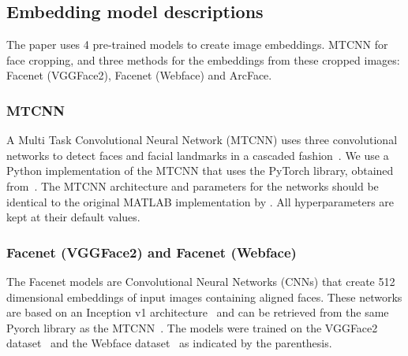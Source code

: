 \subsection{Embedding model descriptions}

The paper uses 4 pre-trained models to create image embeddings.
MTCNN for face cropping, and three methods for the embeddings from these cropped images: Facenet (VGGFace2), Facenet (Webface) and ArcFace.

\subsubsection{MTCNN}
A Multi Task Convolutional Neural Network (MTCNN) uses three convolutional networks to detect faces and facial landmarks in a cascaded fashion~\cite{zhang2016jointmtcnn}.
We use a Python implementation of the MTCNN that uses the PyTorch library, obtained from~\cite{facenetpytorch}.
The MTCNN architecture and parameters for the networks should be identical to the original MATLAB implementation by \citeauthor{zhang2016jointmtcnn}.
All hyperparameters are kept at their default values.

\subsubsection{Facenet (VGGFace2) and Facenet (Webface)}
The Facenet models are Convolutional Neural Networks (CNNs) that create 512 dimensional embeddings of input images containing aligned faces.
These networks are based on an Inception v1 architecture~\cite{Schroff_2015_CVPRinception} and can be retrieved from the same Pyorch library as the MTCNN~\cite{facenetpytorch}.
The models were trained on the VGGFace2 dataset~\cite{cao2018vggface2} and the Webface dataset~\cite{DBLP:journals/corr/YiLLL14awebface} as indicated by the parenthesis.

